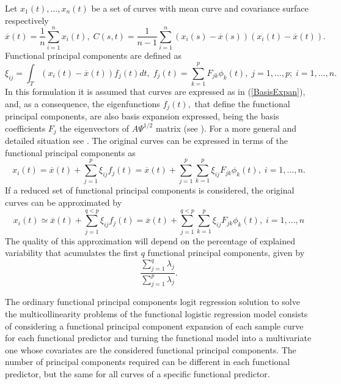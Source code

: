 Let $x_{1}\left( t\right) ,\ldots ,x_{n}\left( t\right) $ be a set of curves with mean curve and covariance surface respectively
\begin{equation*}
\overline{x}\left( t\right) =\dfrac{1}{n}\sum_{i=1}^{n}x_{i}\left( t\right), \; C\left( s,t\right) =\dfrac{1}{n-1}\sum_{i=1}^{n}\left( x_{i}\left(
s\right) -\overline{x}\left( s\right) \right) \left( x_{i}\left( t\right) -%
\overline{x}\left( t\right) \right).
\end{equation*}
Functional principal components are defined as
\begin{equation*}
\xi _{ij}=\int_{T}\left(x_{i}\left( t\right)-\overline{x}\left( t\right) \right) f_j\left( t\right) dt, \; f_{j}\left( t\right) =\sum_{k=1}^{p}F_{jk}\phi _{k}\left( t\right), \;  j=1,\ldots,p; \; i=1,\ldots,n.
\end{equation*}
In this formulation it is assumed that curves are expressed as in (\ref{BasisExpan}), and, as a consequence, the eigenfunctions $f_j(t),$ that define the functional principal components, are also basis expansion expressed, being the basis coefficients $F_j$ the eigenvectors of $A\Psi^{1/2}$ matrix (see \citealp{Ocana2007}). For a more general and detailed situation see \cite{Ramsay05}. The original curves can be expressed in terms of the functional principal components as
\begin{equation*}
x_{i}\left( t\right) =\overline{x}(t)+\sum_{j=1}^{p }\xi _{ij}f_{j}\left( t\right)=\overline{x}(t)+\sum_{j=1}^{p } \sum_{k=1}^{p} \xi _{ij} F_{jk}\phi _{k}\left( t\right),\;i=1,\ldots ,n.
\end{equation*}
If a reduced set of functional principal components is considered, the original curves can be approximated by
\begin{equation}
x_{i}\left( t\right) \simeq \overline{x}(t) + \sum_{j=1}^{q<p }\xi _{ij}f_{j}\left( t\right)=\overline{x}(t)+\sum_{j=1}^{q<p } \sum_{k=1}^{p} \xi _{ij} F_{jk}\phi _{k}\left( t\right),\;i=1,\ldots ,n \label{FPCA}
\end{equation}
The quality of this approximation will depend on the percentage of explained variability that acumulates the first $q$ functional principal components, given by 
\begin{equation*}
\dfrac{\sum_{j=1}^q \lambda_j}{\sum_{j=1}^p \lambda_j}.
\end{equation*}

The ordinary functional principal components logit regression solution to solve the multicollinearity problems of the functional logistic regression model consists of considering a functional principal component expansion of each sample curve for each functional predictor and turning the functional model into a multivariate one whose covariates are the considered functional principal components. The number of principal components required can be different in each functional predictor, but the same for all curves of a specific functional predictor.


